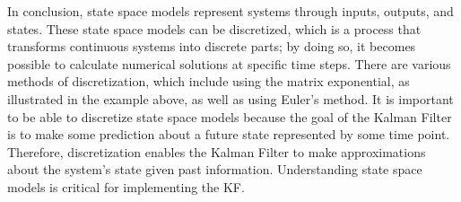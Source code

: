 \noindent  In conclusion, state space models represent systems through inputs, outputs, and states. These state space models can be discretized, which is a process that transforms continuous systems into discrete parts; by doing so, it becomes possible to calculate numerical solutions at specific time steps. There are various methods of discretization, which include using the matrix exponential, as illustrated in the example above, as well as using Euler's method. It is important to be able to discretize state space models because the goal of the Kalman Filter is to make some prediction about a future state represented by some time point. Therefore, discretization enables the Kalman Filter to make approximations about the system's state given past information. Understanding state space models is critical for implementing the KF.
























